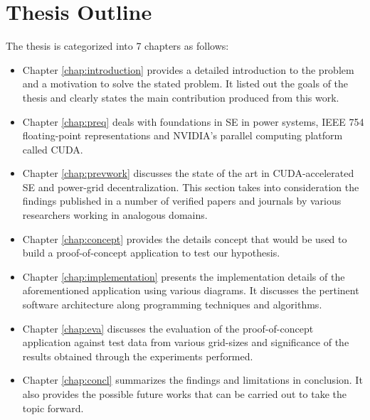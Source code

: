 \documentclass[thesis.tex]{subfiles}
\begin{document}
\section{Thesis Outline}

The thesis is categorized into 7 chapters as follows: \\
\begin{itemize}
	\item Chapter \ref{chap:introduction} provides a detailed introduction to the problem and a motivation to solve the stated problem. It listed out the goals of the thesis and clearly states the main contribution produced from this work.
	\item Chapter \ref{chap:preq} deals with foundations in SE in power systems, IEEE 754 floating-point representations and NVIDIA’s parallel computing platform called CUDA.
	\item Chapter \ref{chap:prevwork} discusses the state of the art in CUDA-accelerated SE and power-grid decentralization. This section takes into consideration the findings published in a number of verified papers and journals by various researchers working in analogous domains.
	\item Chapter \ref{chap:concept} provides the details concept that would be used to build a proof-of-concept application to test our hypothesis.
	\item Chapter \ref{chap:implementation} presents the implementation details of the aforementioned application using various diagrams. It discusses the pertinent software architecture along programming techniques and algorithms.
	\item Chapter \ref{chap:eva} discusses the evaluation of the proof-of-concept application against test data from various grid-sizes and significance of the results obtained through the experiments performed.
	\item Chapter \ref{chap:concl} summarizes the findings and limitations in conclusion. It also provides the possible future works that can be carried out to take the topic forward.
\end{itemize}


\subfilebib %
\end{document}
